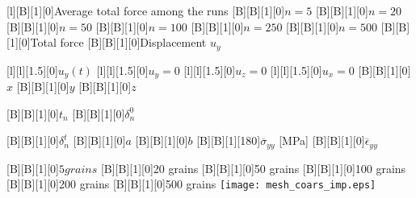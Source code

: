 \documentclass[border=12pt, crop]{standalone}
\begin{document}
  
  
      [l][B][1][0]{Average total force among the runs}
      [B][B][1][0]{$n = 5$}
      [B][B][1][0]{$n = 20$}
      [B][B][1][0]{$n = 50$}
      [B][B][1][0]{$n = 100$}
      [B][B][1][0]{$n = 250$}
      [B][B][1][0]{$n = 500$}
      [B][B][1][0]{Total force}
      [B][B][1][0]{Displacement $u_y$}
            
      [l][l][1.5][0]{$u_y(t)$}
      [l][l][1.5][0]{$u_y = 0$}
      [l][l][1.5][0]{$u_z = 0$}
      [l][l][1.5][0]{$u_x = 0$}
 [B][B][1][0]{$x$}
  [B][B][1][0]{$y$}  
  [B][B][1][0]{$z$}
  
    [B][B][1][0]{$t_n$}
        [B][B][1][0]{$\delta_n^0$}

    [B][B][1][0]{$\delta_n^t$}
    [B][B][1][0]{$a$}
    [B][B][1][0]{$b$}
     [B][B][1][180]{$\overline{\sigma}_{yy}$ [MPa]}
   [B][B][1][0]{$\overline{\epsilon}_{yy}$}

   [B][B][1][0]{$5 grains$}
 [B][B][1][0]{20 grains}
  [B][B][1][0]{50 grains}
   [B][B][1][0]{100 grains}
    [B][B][1][0]{200 grains}
    [B][B][1][0]{500 grains}
      \texttt{[image: mesh\_coars\_imp.eps]}

    
\end{document}
